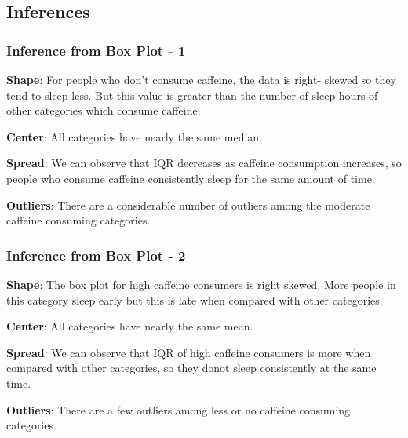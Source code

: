 \documentclass[11pt,]{beamer}
\begin{document}
\subsection{Inferences}

\begin{frame}

	\frametitle{Inference from Box Plot - 1}
	
    \textbf{Shape}: For people who don't consume caffeine, the data is right- skewed so they tend to sleep less. But this value is greater than the number of sleep hours of other categories which consume caffeine. 
    
    \bigskip
    
    \textbf{Center}: All categories have nearly the same median.
    
    \bigskip
    
    \textbf{Spread}: We can observe that IQR decreases as caffeine consumption increases, so people who consume caffeine consistently sleep for the same amount of time.
    
    \bigskip
    
    \textbf{Outliers}: There are a considerable number of outliers among the moderate caffeine consuming categories.

\end{frame}

\begin{frame}

	\frametitle{Inference from Box Plot - 2}
	
	\textbf{Shape}: The box plot for high caffeine consumers is right skewed. More people in this category sleep early but this is late when compared with other categories.
	
	\bigskip
	
    \textbf{Center}: All categories have nearly the same mean.
    
    \bigskip
    
    \textbf{Spread}: We can observe that IQR of high caffeine consumers is more when compared with other categories, so they donot sleep consistently at the same time.
    
    \bigskip
    
    \textbf{Outliers}: There are a few outliers among less or no caffeine consuming categories.
    
\end{frame}
\end{document}
